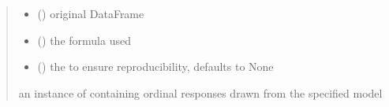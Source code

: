 \documentclass[letterpaper,10pt,english]{sphinxmanual}
\begin{document}
\begin{fulllineitems}
\begin{quote}
\begin{description}
\begin{itemize}
\item {} 
\sphinxAtStartPar
{} () \textendash{} original DataFrame

\item {} 
\sphinxAtStartPar
{} () \textendash{} the formula used

\item {} 
\sphinxAtStartPar
{} (\sphinxstyleliteralemphasis{\sphinxupquote{, }}) \textendash{} the  to ensure reproducibility, defaults to None

\end{itemize}

\sphinxAtStartPar
an instance of  containing ordinal responses drawn from the specified model

\end{description}\end{quote}

\end{fulllineitems}

\end{document}
